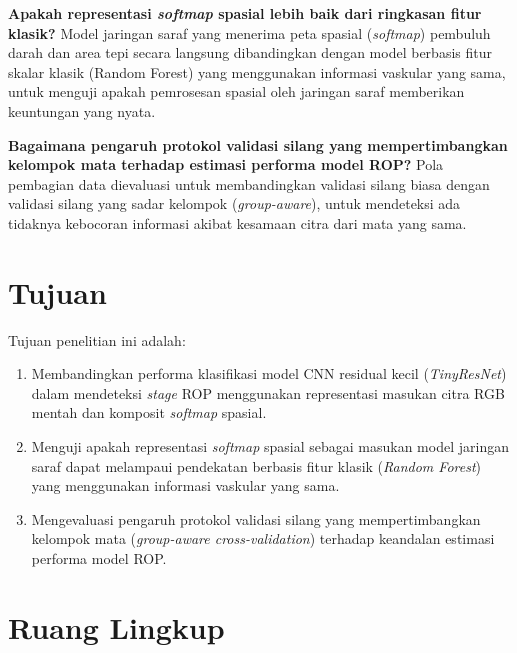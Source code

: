 \vspace{2mm}
\noindent\textbf{Apakah representasi \textit{softmap} spasial lebih baik dari ringkasan fitur klasik?}
Model jaringan saraf yang menerima peta spasial (\textit{softmap}) pembuluh darah dan area tepi secara langsung dibandingkan dengan model berbasis fitur skalar klasik (Random Forest) yang menggunakan informasi vaskular yang sama, untuk menguji apakah pemrosesan spasial oleh jaringan saraf memberikan keuntungan yang nyata.

\vspace{2mm}
\noindent\textbf{Bagaimana pengaruh protokol validasi silang yang mempertimbangkan kelompok mata terhadap estimasi performa model ROP?}
Pola pembagian data dievaluasi untuk membandingkan validasi silang biasa dengan validasi silang yang sadar kelompok (\textit{group-aware}), untuk mendeteksi ada tidaknya kebocoran informasi akibat kesamaan citra dari mata yang sama.

\section{Tujuan}

Tujuan penelitian ini adalah:

\begin{enumerate}
    \item Membandingkan performa klasifikasi model CNN residual kecil (\textit{TinyResNet}) dalam mendeteksi \textit{stage} ROP menggunakan representasi masukan citra RGB mentah dan komposit \textit{softmap} spasial.
    \item Menguji apakah representasi \textit{softmap} spasial sebagai masukan model jaringan saraf dapat melampaui pendekatan berbasis fitur klasik (\textit{Random Forest}) yang menggunakan informasi vaskular yang sama.
    \item Mengevaluasi pengaruh protokol validasi silang yang mempertimbangkan kelompok mata (\textit{group-aware cross-validation}) terhadap keandalan estimasi performa model ROP.
\end{enumerate}

\section{Ruang Lingkup}

